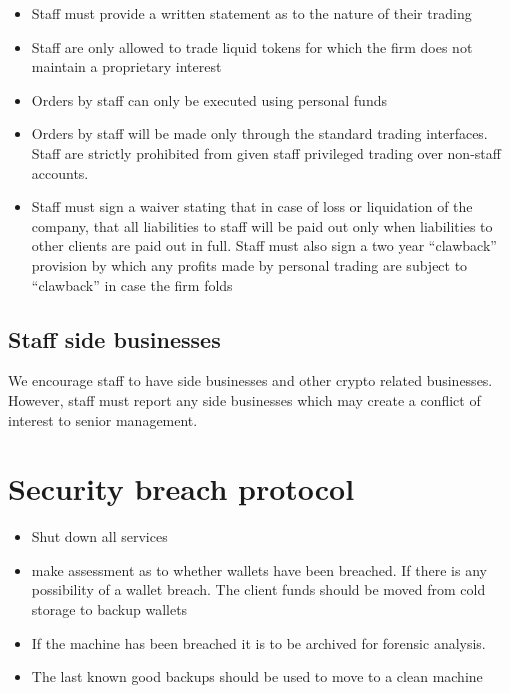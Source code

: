 \begin{itemize}
 \item Staff must provide a written statement as to the nature of
   their trading
  \item Staff are only allowed to trade liquid tokens for which the
    firm does not maintain a proprietary interest
  \item Orders by staff can only be executed using personal funds
  \item Orders by staff will be made only through the standard trading
    interfaces.  Staff are strictly prohibited from given staff
    privileged trading over non-staff accounts.
  \item Staff must sign a waiver stating that in case of loss or
    liquidation of the company, that all liabilities to staff will be
    paid out only when liabilities to other clients are paid out in
    full.  Staff must also sign a two year ``clawback'' provision by
    which any profits made by personal trading are subject to
    ``clawback'' in case the firm folds
\end{itemize}


\subsection{Staff side businesses}
We encourage staff to have side businesses and other crypto related
businesses.  However, staff must report any side businesses which may
create a conflict of interest to senior management.

\section{Security breach protocol}

\begin{itemize}
\item Shut down all services
  \item make assessment as to whether wallets have been breached.  If
    there is any possibility of a wallet breach.  The client funds should be
    moved from cold storage to backup wallets
\item If the machine has been breached it is to be archived for
  forensic analysis.
\item The last known good backups should be used to
  move to a clean machine
  
\end{itemize}    
